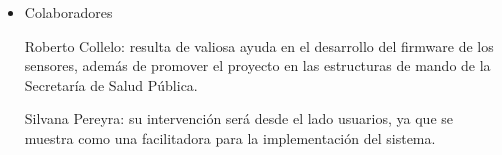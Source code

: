  
\begin{itemize}
\item Colaboradores

Roberto Collelo: resulta de valiosa ayuda en el desarrollo del firmware de los sensores, además de promover el proyecto en las estructuras de mando de la Secretaría de Salud Pública.

Silvana Pereyra: su intervención será desde el lado usuarios, ya que se muestra como una facilitadora para la implementación del sistema.
\end{itemize}